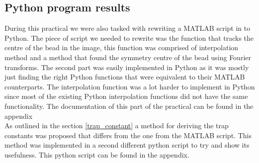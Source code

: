 \clearpage{}
\subsection{Python program results}
\label{results}
During this practical we were also tasked with rewriting a MATLAB script in to Python. The piece of script we needed to rewrite was the function that tracks the centre of the bead in the image, this function was comprised of interpolation method and a method that found the symmetry centre of the bead using Fourier transforms. The second part was easily implemented in Python as it was mostly just finding the right Python functions that were equivalent to their MATLAB counterparts. The interpolation function was a lot harder to implement in Python since most of the existing Python interpolation functions did not have the same functionality. The documentation of this part of the practical can be found in the appendix\\

As outlined in the section \ref{trap_constant} a method for deriving the trap constants was proposed that differs from the one from the MATLAB script. This method was implemented in a second different python script to try and show its usefulness. This python script can be found in the appendix.\\

